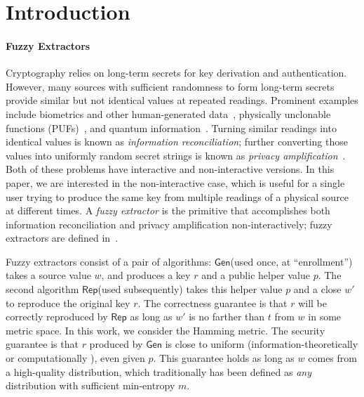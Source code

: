 \documentclass[11pt]{article}
\newcommand{\class}[1]{{\ensuremath{\mathsf{#1}}}}
\newcommand{\gen}{\ensuremath{\class{Gen}}\xspace}
\newcommand{\rep}{\ensuremath{\class{Rep}}\xspace}
\begin{document}
\section{Introduction}\label{sec:introduction}

\paragraph{Fuzzy Extractors}
Cryptography relies on long-term secrets for key derivation and authentication. However, many sources with sufficient randomness to form long-term secrets provide similar but not identical values at repeated readings. Prominent examples include biometrics and other human-generated data~\cite{daugman2004,zviran1993comparison,brostoff2000passfaces,ellison2000protecting,mayrhofer2009shake,monrose2002password},
physically unclonable functions (PUFs)~\cite{pappu2002physical,tuyls2006puf,gassend2002silicon,suh2007physical},
and quantum information~\cite{bennett1988privacy}. Turning similar readings into identical values is known as \emph{information reconciliation}; further converting those values into uniformly random secret strings is known as \emph{privacy amplification}~\cite{bennett1988privacy}.
Both of these problems have interactive and non-interactive versions.  In this paper, we are interested in the non-interactive case, which is useful for a single user trying to produce the same key from multiple readings of a physical source at different times.
 A \emph{fuzzy extractor} is the primitive that accomplishes both information reconciliation and privacy amplification non-interactively; fuzzy extractors are defined in~\cite{DBLP:journals/siamcomp/DodisORS08}.


Fuzzy extractors consist of a pair of algorithms: \gen (used once, at ``enrollment'') takes a source value $w$, and produces a key $r$ and a public helper value $p$.  The second algorithm \rep (used subsequently) takes this helper value $p$ and a close $w'$ to reproduce the original key $r$.
The correctness guarantee is that $r$ will be correctly reproduced by \rep as long as $w'$ is no farther than $t$ from $w$ in some metric space. In this work, we consider the Hamming metric.
 The security guarantee is that $r$ produced by \gen is close to uniform (information-theoretically \cite{DBLP:journals/siamcomp/DodisORS08} or computationally \cite{fuller2013computational}), even given $p$. This guarantee holds as long as $w$ comes from a high-quality distribution, which
traditionally has been defined as \emph{any} distribution with sufficient min-entropy $m$.
\end{document}
